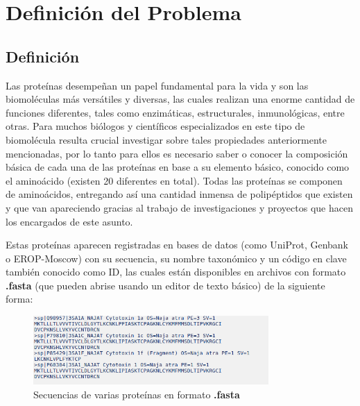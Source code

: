 \chapter{Definición del Problema}

\section{Definición}

Las proteínas desempeñan un papel fundamental para la vida y son las biomoléculas más versátiles y diversas, las cuales realizan una enorme cantidad de funciones diferentes, tales como enzimáticas, estructurales, inmunológicas, entre otras. Para muchos biólogos y científicos especializados en este tipo de biomolécula resulta crucial investigar sobre tales propiedades anteriormente mencionadas, por lo tanto para ellos es necesario saber o conocer la composición básica de cada una de las proteínas en base a su elemento básico, conocido como el aminoácido (existen 20 diferentes en total). Todas las proteínas se componen de aminoácidos, entregando así una cantidad inmensa de polipéptidos que existen y que van apareciendo gracias al trabajo de investigaciones y proyectos que hacen los encargados de este asunto.

Estas proteínas aparecen registradas en bases de datos (como UniProt, Genbank o EROP-Moscow) con su secuencia, su nombre taxonómico y un código en clave también conocido como ID, las cuales están disponibles en archivos con formato \textbf{.fasta} \cite{fasta} (que pueden abrise usando un editor de texto básico) de la siguiente forma:

\begin{figure}[ht]
    \centering
    \includegraphics[width=0.8\textwidth]{./images/secuencias.png}
    \caption{Secuencias de varias proteínas en formato \textbf{.fasta}}
    \label{fig:image4}
\end{figure}


